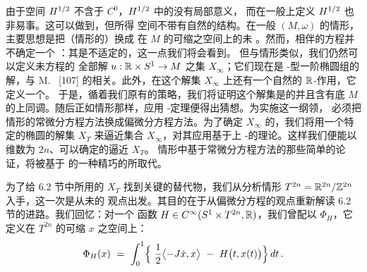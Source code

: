 由于空间 $H^{1/2}$ 不含于 $C^{0}$，$H^{1/2}$ 中的\trLoop{}没有局部意义，%
而在一般\trManifold{}上定义 $H^{1/2}$ \trLoop{}也非易事。这可以做到，但所得%
空间不带有自然的\trManifold{}结构。在一般\trSymplecticManifold{} $(M,\omega)$%
的情形，主要思想是把（\trTorus{}情形的）\trRegularization\trGradient{}换成%
\trAction\trFunctional{}在 $M$ 的\trSmooth{}可缩\trLoop{}之空间上的未%
\trRegularization\trGradient。然而，相伴的\trGradient{}方程并不确定一个%
\trFlow：其\trCauchy\trInitialValueProblem{}是不适定的，这一点我们将会看到。%
但与\trTorus{}情形类似，我们仍然可以定义未\trRegularization\trGradient{}方程的%
全部\trBounded{}解 $u:\mathbb{R}\times S^{1}\to M$ 之集 $X_{\infty}$；它们现在是%
\trCauchy-\trRiemann{}型一阶椭圆\trPartialDifferentialEquation{}组的解，与%
M.~\trGromov{} [107] 的\trPseudoholomorphic\trCurve{}相关。此外，在这个解集%
$X_{\infty}$ 上还有一个自然的 $\mathbb{R}$-作用，它定义一个\trGradientLike\trFlow。%
于是，循着我们原有的策略，我们将证明这个解集是\trCompact{}的并且含有底%
\trManifold{} $M$ 的上同调。随后正如\trTorus{}情形那样，应用%
\trLjusternik-\trSchnirelman{}定理便得出\trArnold{}猜想。为实施这一纲领，%
必须把\trTorus{}情形的常微分方程方法换成偏微分方程方法。为了确定 $X_{\infty}$%
的\trTopology，我们将用一个特定的椭圆\trBoundaryValueProblem{}的解集 $X_{T}$%
来逼近集合 $X_{\infty}$，对其应用基于\trCompact\trSurface{}上%
\trCauchy-\trRiemann\trOperator{}的\trFredholm{}理论。这样我们便能以维数为%
$2n$、\trTopology{}可以确定的\trSmooth\trCompact\trManifold{}逼近 $X_{T}$。%
\trTorus{}情形中基于常微分方程方法的那些简单的\trCompactness{}论证，将被基于%
\trEllipticEstimate{}的一种精巧的\trBubblingOffAnalysis{}所取代。

为了给 6.2 节中所用的 $X_{T}$ 找到关键的替代物，我们从分析\trTorus{}情形%
$T^{2n}=\mathbb{R}^{2n}/\mathbb{Z}^{2n}$ 入手，这一次是从未\trRegularization\trGradient{}的%
观点出发。其目的在于从偏微分方程的观点重新解读 6.2 节的进路。我们回忆：对一个%
\trPeriodic{}函数 $H\in C^{\infty}(S^{1}\times T^{2n},\mathbb{R})$，我们曾配以%
\trAction\trFunctional{} $\Phi_{H}$，它定义在 $T^{2n}$ 的\trSmooth{}可缩%
\trLoop{} $x$ 之空间上：
\begin{equation}\label{eq:ell-action-functional}
\Phi_{H}(x)\ =\ \int_{0}^{1}\Bigl\{\ \frac{1}{2}\bigl\langle-J\dot{x},x\bigr\rangle%
\ -\ H\bigl(t,x(t)\bigr)\Bigr\}\,dt\,.
\end{equation}

